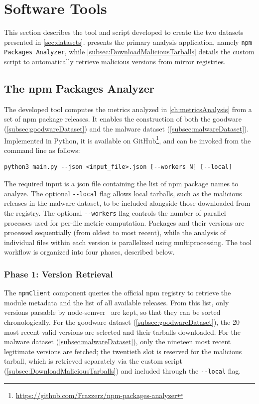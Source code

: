 \section{Software Tools}
\label{sec:SoftwareTools}

This section describes the tool and script developed to create the two datasets presented in \cref{sec:datasets}.
 presents the primary analysis application, namely \texttt{npm Packages Analyzer},
while \cref{subsec:DownloadMaliciousTarballs} details the custom script to automatically retrieve malicious versions from mirror registries.

\subsection{The npm Packages Analyzer}
\label{subsec:ToolForAnalyzingPkgs}

The developed tool computes the metrics analyzed in \cref{ch:metricsAnalysis} from a set of \ac{npm} package releases.
It enables the construction of both the goodware (\cref{subsec:goodwareDataset}) and the malware dataset (\cref{subsec:malwareDataset}).
Implemented in Python, it is available on GitHub\footnote{\url{https://github.com/Frazzerz/npm-packages-analyzer}},
and can be invoked from the command line as follows:
\begin{verbatim}
python3 main.py --json <input_file>.json [--workers N] [--local]
\end{verbatim}

The required input is a json file containing the list of \ac{npm} package names to analyze. 
The optional \texttt{-{}-local} flag allows local tarballs,
such as the malicious releases in the malware dataset, 
to be included alongside those downloaded from the registry.
The optional \texttt{-{}-workers} flag controls the number of parallel processes used for per-file metric computation. 
Packages and their versions are processed sequentially (from oldest to most recent), 
while the analysis of individual files within each version is parallelized using multiprocessing. 
The tool workflow is organized into four phases, described below.

\subsubsection{Phase 1: Version Retrieval}
\label{subsubsec:ToolForAnalyzingPkgsPhase1}

The \texttt{npmClient} component queries the official \ac{npm} registry to retrieve the module metadata and the list of all available releases. 
From this list, only versions parsable by node-semver~\cite{semver} are kept, 
so that they can be sorted chronologically. 
For the goodware dataset (\cref{subsec:goodwareDataset}), the 20 most recent valid versions are selected and their tarballs downloaded. 
For the malware dataset (\cref{subsec:malwareDataset}), only the nineteen most recent legitimate versions are fetched; 
the twentieth slot is reserved for the malicious tarball, 
which is retrieved separately via the custom script (\cref{subsec:DownloadMaliciousTarballs}) and included through the \texttt{-{}-local} flag.


